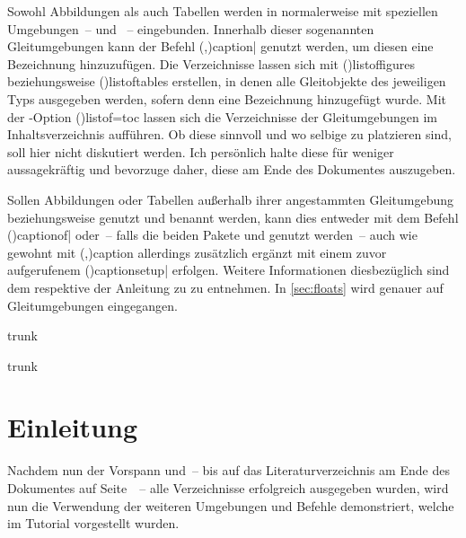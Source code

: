 \documentclass[%
  english,ngerman,%
  cdgeometry=no,DIV=12,%
  cd=false,cdfont=false,cdtitle=true,%
  headings=normal,%
  automark,%
  listof=toc,%
]{tudscrartcl}
\begin{document}
Sowohl Abbildungen als auch Tabellen werden in  normalerweise 
mit speziellen Umgebungen~--  und ~-- 
eingebunden. Innerhalb dieser sogenannten Gleitumgebungen kann der Befehl 
\Macro(,){caption|%
  }
genutzt werden, um diesen eine Bezeichnung hinzuzufügen. Die Verzeichnisse 
lassen sich mit \Macro(){listoffigures} beziehungsweise 
\Macro(){listoftables} erstellen, in denen alle 
Gleitobjekte des jeweiligen Typs ausgegeben werden, sofern denn eine 
Bezeichnung hinzugefügt wurde. Mit der \KOMAScript-Option 
\Option(){listof=toc} lassen sich die Verzeichnisse der 
Gleitumgebungen im Inhaltsverzeichnis aufführen. Ob diese sinnvoll und wo 
selbige zu platzieren sind, soll hier nicht diskutiert werden. Ich persönlich 
halte diese für weniger aussagekräftig und bevorzuge daher, diese am Ende des 
Dokumentes auszugeben. 

Sollen Abbildungen oder Tabellen außerhalb ihrer angestammten Gleitumgebung 
 beziehungsweise  genutzt und benannt 
werden, kann dies entweder mit dem Befehl 
\Macro(){captionof|%
  }
oder~-- falls die beiden Pakete  und  
genutzt werden~-- auch wie gewohnt mit 
\Macro(,){caption} allerdings zusätzlich 
ergänzt mit einem zuvor aufgerufenem
\Macro(){captionsetup|} 
erfolgen. Weitere Informationen diesbezüglich sind dem \scrguide respektive der 
Anleitung zu  zu entnehmen. In \autoref{sec:floats} wird 
genauer auf Gleitumgebungen eingegangen.
%
\begin{Code}{trunk}
\tableofcontents
\listoffigures
\listoftables

\end{Code}

\begin{Code}[nolst]{trunk}
\printacronyms[style=acrotabu]
\printsymbols[style=symblongtabu]

\chapter{Einleitung}

Nachdem nun der Vorspann und~-- bis auf das Literaturverzeichnis am 
Ende des Dokumentes auf Seite~\pageref{sec:bibliography}~-- alle 
Verzeichnisse erfolgreich ausgegeben wurden, wird nun die Verwendung 
der weiteren Umgebungen und Befehle demonstriert, welche im Tutorial 
 vorgestellt wurden.

\end{Code}
\end{document}
